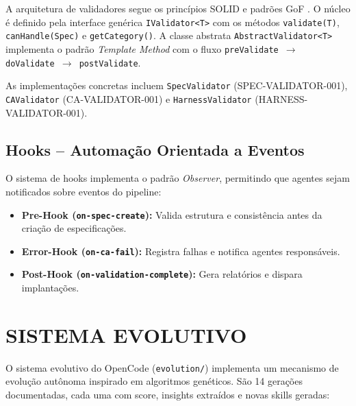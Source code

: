 \documentclass[
  brazil,
  sumario=tradicional,
  10pt
]{abntex2}
\begin{document}
A arquitetura de validadores segue os princípios SOLID
\cite{martin2000principles} e padrões GoF \cite{gamma1995design}.
O núcleo é definido pela interface genérica \texttt{IValidator<T>}
com os métodos \texttt{validate(T)}, \texttt{canHandle(Spec)} e
\texttt{getCategory()}. A classe abstrata
\texttt{AbstractValidator<T>} implementa o padrão \textit{Template
Method} com o fluxo \texttt{preValidate $\rightarrow$ doValidate
$\rightarrow$ postValidate}.

As implementações concretas incluem \texttt{SpecValidator}
(SPEC-VALIDATOR-001), \texttt{CAValidator} (CA-VALIDATOR-001) e
\texttt{HarnessValidator} (HARNESS-VALIDATOR-001).

\subsection{Hooks -- Automação Orientada a Eventos}

O sistema de hooks implementa o padrão \textit{Observer}, permitindo
que agentes sejam notificados sobre eventos do pipeline:

\begin{itemize}
  \item \textbf{Pre-Hook (\texttt{on-spec-create}):} Valida estrutura
    e consistência antes da criação de especificações.
  \item \textbf{Error-Hook (\texttt{on-ca-fail}):} Registra falhas
    e notifica agentes responsáveis.
  \item \textbf{Post-Hook (\texttt{on-validation-complete}):} Gera
    relatórios e dispara implantações.
\end{itemize}

\section{SISTEMA EVOLUTIVO}
\label{sec:evolucao}

O sistema evolutivo do OpenCode (\texttt{evolution/}) implementa um
mecanismo de evolução autônoma inspirado em algoritmos genéticos. São
14 gerações documentadas, cada uma com score, insights extraídos e
novas skills geradas:
\end{document}
